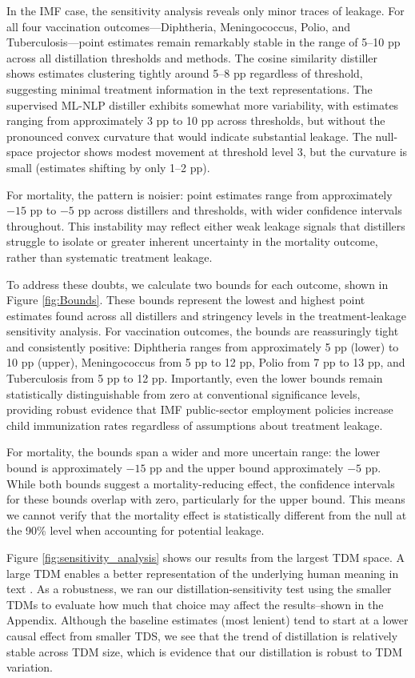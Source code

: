 \documentclass[11pt]{article}
\begin{document}
In the IMF case, the sensitivity analysis reveals only minor traces of leakage. For all four vaccination outcomes---Diphtheria, Meningococcus, Polio, and Tuberculosis---point estimates remain remarkably stable in the range of 5--10 pp across all distillation thresholds and methods. The cosine similarity distiller shows estimates clustering tightly around 5--8 pp regardless of threshold, suggesting minimal treatment information in the text representations. The supervised ML-NLP distiller exhibits somewhat more variability, with estimates ranging from approximately 3 pp to 10 pp across thresholds, but without the pronounced convex curvature that would indicate substantial leakage. The null-space projector shows modest movement at threshold level 3, but the curvature is small (estimates shifting by only 1--2 pp).

For mortality, the pattern is noisier: point estimates range from approximately $-15$ pp to $-5$ pp across distillers and thresholds, with wider confidence intervals throughout. This instability may reflect either weak leakage signals that distillers struggle to isolate or greater inherent uncertainty in the mortality outcome, rather than systematic treatment leakage.

To address these doubts, we calculate two bounds for each outcome, shown in Figure \ref{fig:Bounds}. These bounds represent the lowest and highest point estimates found across all distillers and stringency levels in the treatment-leakage sensitivity analysis. For vaccination outcomes, the bounds are reassuringly tight and consistently positive: Diphtheria ranges from approximately 5 pp (lower) to 10 pp (upper), Meningococcus from 5 pp to 12 pp, Polio from 7 pp to 13 pp, and Tuberculosis from 5 pp to 12 pp. Importantly, even the lower bounds remain statistically distinguishable from zero at conventional significance levels, providing robust evidence that IMF public-sector employment policies increase child immunization rates regardless of assumptions about treatment leakage.

For mortality, the bounds span a wider and more uncertain range: the lower bound is approximately $-15$ pp and the upper bound approximately $-5$ pp. While both bounds suggest a mortality-reducing effect, the confidence intervals for these bounds overlap with zero, particularly for the upper bound. This means we cannot verify that the mortality effect is statistically different from the null at the 90\% level when accounting for potential leakage.

Figure \ref{fig:sensitivity_analysis} shows our results from the largest TDM space. A large TDM enables a better representation of the underlying human meaning in text \citep{gentzkow2019text}. As a robustness, we ran our distillation-sensitivity test using the smaller TDMs to evaluate how much that choice may affect the results--shown in the Appendix. Although the baseline estimates (most lenient) tend to start at a lower causal effect from smaller TDS, we see that the trend of distillation is relatively stable across TDM size, which is evidence that our distillation is robust to TDM variation.
\end{document}
